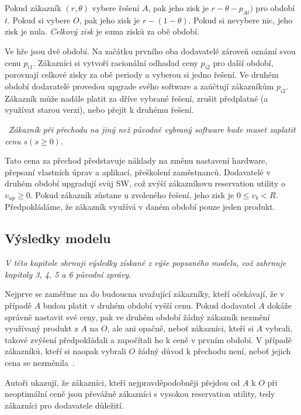 \begin{multicols}{2}
	Pokud zákazník $(r,\theta)$ vybere řešení $A$, pak jeho zisk je $r-\theta - p_{At})$ pro období $t$. Pokud si vybere $O$, pak jeho zisk je $r-(1-\theta)$. Pokud si nevybere nic, jeho zisk je nula. {\em Celkový zisk} je suma zisků za obě období.

	Ve hře jsou dvě období. Na začátku prvního oba dodavatelé zároveň oznámí svou cenu $p_{i1}$. Zákazníci si vytvoří racionální odhadad ceny $p_{i2}$ pro další období, porovnají celkové zisky za obě periody a vyberou si jedno řešení. Ve druhém období dodavatelé provedou upgrade svého software a zaúčtují zákazníkům $p_{i2}$. Zákazník může nadále platit za dříve vybrané řešení, zrušit předplatné (a využívat starou verzi), nebo přejít k druhému řešení.

		\vspace{10pt}
		~{\em Zákazník při přechodu na jiný než původně vybraný software bude muset zaplatit cenu $s (s\geq0)$.}
		\vspace{10pt}

	Tato cena za přechod představuje náklady na změnu nastavení hardware, přepsaní vlastních úprav a aplikací, přeškolení zaměstnanců. Dodavatelé v druhém období upgradují svůj SW, což zvýší zákazníkovu reservation utility o $v_{up}\geq0$. Pokud zákazník zůstane u zvoleného řešení, jeho zisk je $0\leq v_b < R$. Předpokládáme, že zákazník využívá v daném období pouze jeden produkt.

	\subsection*{Výsledky modelu}
	{\em V této kapitole shrnuji výsledky získané z výše popsaného modelu, což zahrnuje kapitoly 3, 4, 5 a 6 původní zprávy.}

	Nejprve se zaměřme na do budoucna uvažující zákazníky, kteří očekávají, že v případě $A$ budou platit v druhém období vyšší cenu. Pokud dodavatel $A$ dokáže správně nastavit své ceny, pak ve druhém období žádný zákazník nezmění využívaný produkt z $A$ na $O$, ale ani opačně, neboť zákazníci, kteří si $A$ vybrali, takové zvýšení předpokládali a započítali ho k ceně v prvním období. V případě zákazníků, kteří si naopak vybrali $O$ žádný důvod k přechodu není, neboť jejich cena se nezměnila~\cite[kap. 3: Lemma 1]{lock-in-competition}.

	Autoři ukazují, že zákazníci, kteří nejpravděpodobněji přejdou od $A$ k $O$ při neoptimální ceně jsou převážně zákazníci s vysokou reservation utility, tedy zákazníci pro dodavatele důležití.


\end{multicols}
